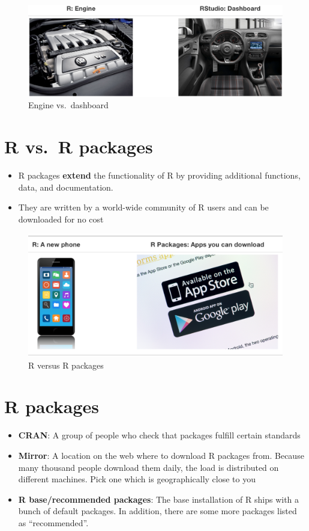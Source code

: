 \documentclass[]{book}
\begin{document}
\begin{figure}
\centering
\includegraphics{img/engine-dashboard.png}
\caption{Engine vs.~dashboard}
\end{figure}

\hypertarget{r-vs.r-packages}{%
\section{R vs.~R packages}\label{r-vs.r-packages}}

\begin{itemize}
\item
  R packages \textbf{extend} the functionality of R by providing additional functions, data, and documentation.
\item
  They are written by a world-wide community of R users and can be downloaded for no cost
\end{itemize}

\begin{figure}
\centering
\includegraphics{img/r_vs_r_packages.png}
\caption{R versus R packages}
\end{figure}

\hypertarget{r-packages}{%
\section{R packages}\label{r-packages}}

\begin{itemize}
\item
  \textbf{CRAN}: A group of people who check that packages fulfill certain standards
\item
  \textbf{Mirror}: A location on the web where to download R packages from. Because many thousand people download them daily, the load is distributed on different machines. Pick one which is geographically close to you
\item
  \textbf{R base/recommended packages}: The base installation of R ships with a bunch of default packages. In addition, there are some more packages listed as ``recommended''.
\end{itemize}
\end{document}
